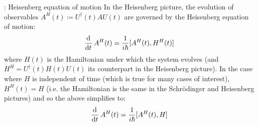 \begin{thmbox}{: Heisenberg equation of motion}
    In the Heisenberg picture, the evolution of observables $A^H(t) \coloneqq U^\dag(t) A U(t)$ are governed by the Heisenberg equation of motion:
    \begin{equation}\label{eq-Heisenberggeneral}
        \dod{}{t} A^H(t) = \frac{1}{i\hbar}[A^H(t), H^H(t)]
    \end{equation}
    where $H(t)$ is the Hamiltonian under which the system evolves (and $H^H = U^\dag(t) H(t) U(t)$ its counterpart in the Heisenberg picture). In the case where $H$ is independent of time (which is true for many cases of interest), $H^H(t) = H$ (i.e. the Hamiltonian is the same in the Schr\"{o}dinger and Heisenberg pictures) and so the above simplifies to:
    \begin{equation}\label{eq-Heisenberg}
        \dod{}{t} A^H(t) = \frac{1}{i\hbar}[A^H(t), H]
    \end{equation}
\end{thmbox}
